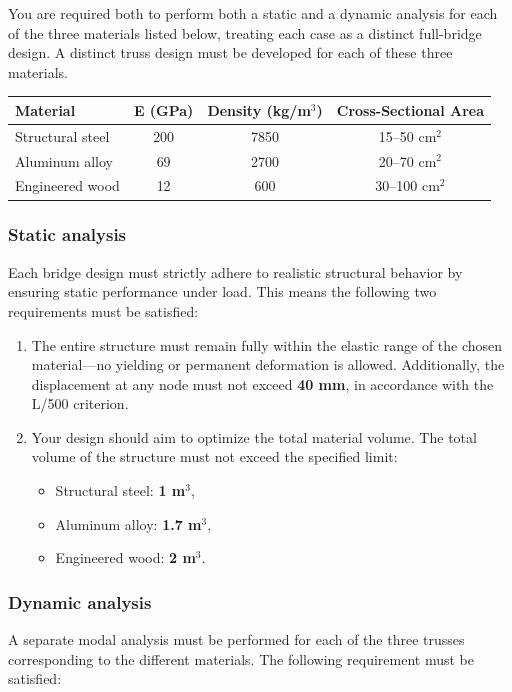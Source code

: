 \documentclass[12pt]{article}
\begin{document}
You are required both to perform both a static and a dynamic analysis for each of the three materials listed below, treating each case as a distinct full-bridge design. A distinct truss design must be developed for each of these three materials.
\begin{center}
  \begin{tabular}{l|c|c|c}
    {Material}       & {E (GPa)} & {Density (kg/m$^3$)} & {Cross-Sectional Area} \\
    \hline
    Structural steel & 200       & 7850                 & 15–50 cm$^2$           \\
    Aluminum alloy   & 69        & 2700                 & 20–70 cm$^2$           \\
    Engineered wood  & 12        & 600                  & 30–100 cm$^2$          \\
  \end{tabular}
\end{center}

\subsubsection*{Static analysis}
Each bridge design must strictly adhere to realistic structural behavior by ensuring static performance under load. This means the following two requirements must be satisfied:
\begin{enumerate}
  \item The entire structure must remain fully within the elastic range of the chosen material—no yielding or permanent deformation is allowed. Additionally, the displacement at any node must not exceed \textbf{40 mm}, in accordance with the L/500 criterion.
  \item Your design should aim to optimize the total material volume. The total volume of the structure must not exceed the specified limit:
        \begin{itemize}
          \item Structural steel: \textbf{1 m$^3$},
          \item Aluminum alloy: \textbf{1.7 m$^3$},
          \item Engineered wood: \textbf{2 m$^3$}.
        \end{itemize}
\end{enumerate}

\subsubsection*{Dynamic analysis}
A separate modal analysis must be performed for each of the three trusses corresponding to the different materials. The following requirement must be satisfied:
\end{document}
